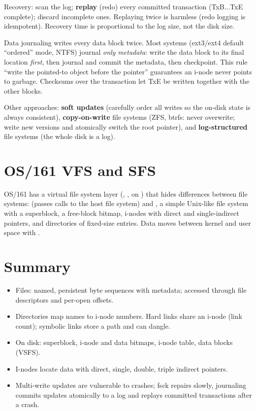 Recovery: scan the log; \textbf{replay} (redo) every committed transaction (TxB...TxE complete);
discard incomplete ones. Replaying twice is harmless (redo logging is idempotent). Recovery time
is proportional to the log size, not the disk size.

\begin{important}
Data journaling writes every data block twice. Most systems (ext3/ext4 default
``ordered'' mode, NTFS) journal \emph{only metadata}: write the data block to its final location
\emph{first}, then journal and commit the metadata, then checkpoint. This rule ``write the
pointed-to object before the pointer'' guarantees an i-node never points to garbage.
Checksums over the transaction let TxE be written together with the other blocks.
\end{important}

Other approaches: \textbf{soft updates} (carefully order all writes so the on-disk state is
always consistent), \textbf{copy-on-write} file systems (ZFS, btrfs: never overwrite; write new
versions and atomically switch the root pointer), and \textbf{log-structured} file systems
(the whole disk is a log).

\section{OS/161 VFS and SFS}
OS/161 has a virtual file system layer (, ,  on
) that hides differences between file systems:  (passes calls to
the host file system) and , a simple Unix-like file system with a superblock, a
free-block bitmap, i-nodes with direct and single-indirect pointers, and directories of
fixed-size entries. Data moves between kernel and user space with .

\section*{Summary}
\begin{itemize}
  \item Files: named, persistent byte sequences with metadata; accessed through file
    descriptors and per-open offsets.
  \item Directories map names to i-node numbers. Hard links share an i-node (link count);
    symbolic links store a path and can dangle.
  \item On disk: superblock, i-node and data bitmaps, i-node table, data blocks (VSFS).
  \item I-nodes locate data with direct, single, double, triple indirect pointers.
  \item Multi-write updates are vulnerable to crashes; fsck repairs slowly, journaling commits
    updates atomically to a log and replays committed transactions after a crash.
\end{itemize}
